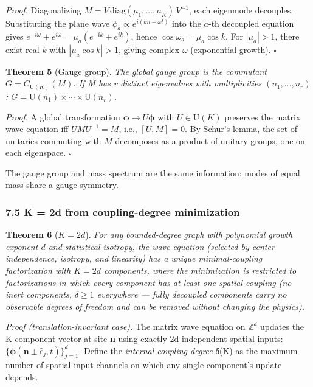 \documentclass[
  11pt,
]{article}
\begin{document}
\emph{Proof.} Diagonalizing
\(M = V\,\text{diag}(\mu_1, \ldots, \mu_K)\,V^{-1}\), each eigenmode
decouples. Substituting the plane wave
\(\phi_a \propto e^{i(kn - \omega t)}\) into the \(a\)-th decoupled
equation gives \(e^{-i\omega} + e^{i\omega} = \mu_a(e^{-ik} + e^{ik})\),
hence \(\cos\omega_a = \mu_a \cos k\). For \(|\mu_a| > 1\), there exist
real \(k\) with \(|\mu_a \cos k| > 1\), giving complex \(\omega\)
(exponential growth). \(\square\)

\textbf{Theorem 5} (Gauge group). \emph{The global gauge group is the
commutant \(G = C_{\mathrm{U}(K)}(M)\). If M has r distinct eigenvalues
with multiplicities \((n_1, \ldots, n_r)\):
\(G = \mathrm{U}(n_1) \times \cdots \times \mathrm{U}(n_r)\).}

\emph{Proof.} A global transformation
\(\boldsymbol{\phi} \to U\boldsymbol{\phi}\) with
\(U \in \mathrm{U}(K)\) preserves the matrix wave equation iff
\(UMU^{-1} = M\), i.e., \([U, M] = 0\). By Schur's lemma, the set of
unitaries commuting with \(M\) decomposes as a product of unitary
groups, one on each eigenspace. \(\square\)

The gauge group and mass spectrum are the same information: modes of
equal mass share a gauge symmetry.

\hypertarget{k-2d-from-coupling-degree-minimization}{%
\subsubsection{7.5 K = 2d from coupling-degree
minimization}\label{k-2d-from-coupling-degree-minimization}}

\textbf{Theorem 6} (\(K = 2d\)). \emph{For any bounded-degree graph with
polynomial growth exponent \(d\) and statistical isotropy, the wave
equation (selected by center independence, isotropy, and linearity) has
a unique minimal-coupling factorization with \(K = 2d\) components,
where the minimization is restricted to factorizations in which every
component has at least one spatial coupling (no inert components,
\(\delta \geq 1\) everywhere --- fully decoupled components carry no
observable degrees of freedom and can be removed without changing the
physics).}

\emph{Proof (translation-invariant case).} The matrix wave equation on
\(\mathbb{Z}^d\) updates the K-component vector at site \textbf{n} using
exactly 2d independent spatial inputs:
\(\{\boldsymbol{\phi}(\mathbf{n} \pm \hat{e}_j, t)\}_{j=1}^d\). Define
the \emph{internal coupling degree} δ(K) as the maximum number of
spatial input channels on which any single component's update depends.
\end{document}
